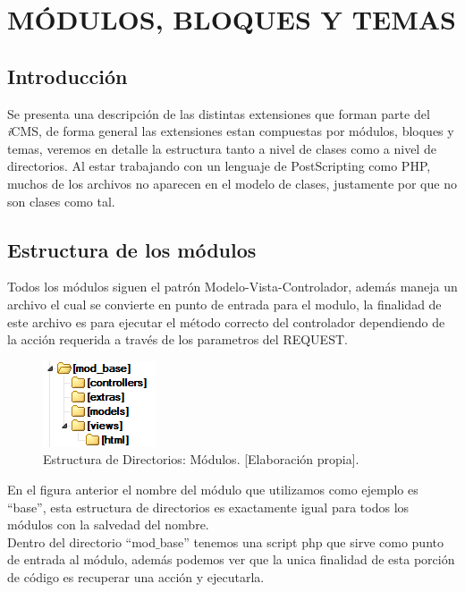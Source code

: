 \chapter{M\'ODULOS, BLOQUES Y TEMAS}
\newpage
\section{Introducci\'on}
Se presenta una descripci\'on de las distintas extensiones que forman parte del \textit{i}CMS, de forma general las extensiones estan compuestas por m\'odulos, bloques y temas, veremos en detalle la estructura tanto a nivel de clases como a nivel de directorios. Al estar trabajando con un lenguaje de PostScripting como PHP, muchos de los archivos no aparecen en el modelo de clases, justamente por que no son clases como tal.

\section{Estructura de los m\'odulos}
Todos los m\'odulos siguen el patr\'on Modelo-Vista-Controlador, adem\'as maneja un archivo el cual se convierte en punto de entrada para el modulo, la finalidad de este archivo es para ejecutar el m\'etodo correcto del controlador dependiendo de la acci\'on requerida a trav\'es de los parametros del REQUEST.

\begin{figure}[h]
\centering
\includegraphics[scale=1, keepaspectratio=true]{imagenes/19_imagen.png}
\caption{Estructura de Directorios: M\'odulos. [Elaboraci\'on propia].}
\end{figure}

En el figura anterior el nombre del m\'odulo que utilizamos como ejemplo es ``base'', esta estructura de directorios es exactamente igual para todos los m\'odulos con la salvedad del nombre.\\
Dentro del directorio ``mod$\_$base'' tenemos una script php que sirve como punto de entrada al m\'odulo, adem\'as podemos ver que la unica finalidad de esta porci\'on de c\'odigo es recuperar una acci\'on y ejecutarla.\\



